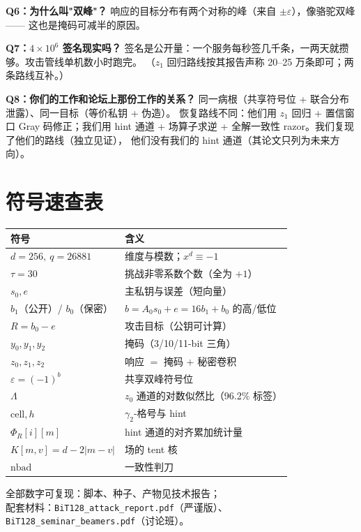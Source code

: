 \documentclass[11pt,a4paper]{ctexart}
\begin{document}
\textbf{Q6：为什么叫"双峰"？}
响应的目标分布有两个对称的峰（来自 $\pm\varepsilon$），像骆驼双峰——
这也是掩码可减半的原因。

\textbf{Q7：$4\times10^6$ 签名现实吗？}
签名是公开量：一个服务每秒签几千条，一两天就攒够。攻击管线单机数小时跑完。
（$z_1$ 回归路线按其报告声称 20--25 万条即可；两条路线互补。）

\textbf{Q8：你们的工作和论坛上那份工作的关系？}
同一病根（共享符号位 + 联合分布泄露）、同一目标（等价私钥 + 伪造）。
恢复路线不同：他们用 $z_1$ 回归 + 置信窗口 Gray 码修正；我们用 hint 通道 +
场算子求逆 + 全解一致性 razor。我们复现了他们的路线（独立见证），
他们没有我们的 hint 通道（其论文只列为未来方向）。

\section{符号速查表}

\begin{center}
\begin{tabular}{@{}ll@{}}
\toprule
符号 & 含义 \\
\midrule
$d=256,\ q=26881$ & 维度与模数；$x^d\equiv-1$ \\
$\tau=30$ & 挑战非零系数个数（全为 $+1$） \\
$s_0, e$ & 主私钥与误差（短向量） \\
$b_1$（公开）/ $b_0$（保密） & $b=A_0s_0+e=16b_1+b_0$ 的高/低位 \\
$R=b_0-e$ & 攻击目标（公钥可计算） \\
$y_0,y_1,y_2$ & 掩码（3/10/11-bit 三角） \\
$z_0,z_1,z_2$ & 响应 $=$ 掩码 $+$ 秘密卷积 \\
$\varepsilon=(-1)^b$ & 共享双峰符号位 \\
$\Lambda$ & $z_0$ 通道的对数似然比（96.2\% 标签） \\
$\mathrm{cell},h$ & $\gamma_2$-格号与 hint \\
$\Phi_R[i][m]$ & hint 通道的对齐累加统计量 \\
$K[m,v]=d-2|m-v|$ & 场的 tent 核 \\
$\mathrm{nbad}$ & 一致性判刀 \\
\bottomrule
\end{tabular}
\end{center}

\vspace{0.6em}
\begin{center}
{\small 全部数字可复现：脚本、种子、产物见技术报告；\\
配套材料：\texttt{BiT128\_attack\_report.pdf}（严谨版）、\texttt{BiT128\_seminar\_beamers.pdf}（讨论班）。}
\end{center}
\end{document}
